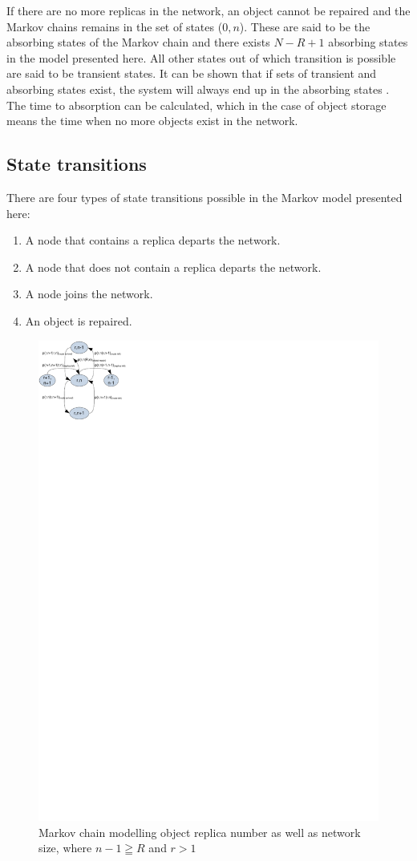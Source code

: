 \documentclass[10pt,a4paper,conference]{IEEEtran}
\begin{document}
If there are no more replicas in the network, an object cannot be repaired and the Markov chains remains in the set of states ($0,n$). These are said to be the absorbing states of the Markov chain and there exists $N - R + 1$ absorbing states in the model presented here. All other states out of which transition is possible are said to be transient states. It can be shown that if sets of transient and absorbing states exist, the system will always end up in the absorbing states \cite{grinstead1997introduction_probability}. The time to absorption can be calculated, which in the case of object storage means the time when no more objects exist in the network.

\subsection{State transitions}

There are four types of state transitions possible in the Markov model presented here:
%
\begin{enumerate}
\item A node that contains a replica departs the network.
\item A node that does not contain a replica departs the network.
\item A node joins the network.
\item An object is repaired.
\end{enumerate}


\begin{figure}[htbp]
 \centering
 \includegraphics[clip=true, viewport=0.0cm 24.5cm 5.5cm 30cm, width=0.6\columnwidth]{Markov_example_syms}
 \caption{Markov chain modelling object replica number as well as network size, where $n-1\geqq R$ and $r > 1$}
 \label{fig_markov_example_syms}
\end{figure}
\end{document}
